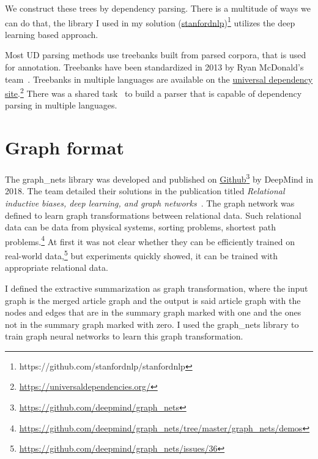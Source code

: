 We construct these trees by dependency parsing. There is a multitude of ways we can do that, the library I used in my solution (\href{https://github.com/stanfordnlp/stanfordnlp}{stanfordnlp})\footnote{https://github.com/stanfordnlp/stanfordnlp} utilizes the deep learning based approach.

Most UD parsing methods use treebanks built from parsed corpora, that is used for annotation. Treebanks have been standardized in 2013 by Ryan McDonald's team~\cite{TextRank}. Treebanks in multiple languages are available on the \href{https://universaldependencies.org/}{universal dependency site}.\footnote{\url{https://universaldependencies.org/}} There was a shared task~\cite{ParserSharedTask} to build a parser that is capable of dependency parsing in multiple languages.

\section{Graph format}

The graph\_nets library was developed and published on \href{https://github.com/deepmind/graph_nets}{Github}\footnote{\url{https://github.com/deepmind/graph_nets}} by DeepMind in 2018. The team detailed their solutions in the publication titled \textit{Relational inductive biases, deep learning, and graph networks}~\cite{GraphNet}. The graph network was defined to learn graph transformations between relational data. Such relational data can be data from physical systems, sorting problems, shortest path problems.\footnote{\url{https://github.com/deepmind/graph_nets/tree/master/graph_nets/demos}} At first it was not clear whether they can be efficiently trained on real-world data,\footnote{\url{https://github.com/deepmind/graph\_nets/issues/36}} but experiments quickly showed, it can be trained with appropriate relational data.

I defined the extractive summarization as graph transformation, where the input graph is the merged article graph and the output is said article graph with the nodes and edges that are in the summary graph marked with one and the ones not in the summary graph marked with zero. I used the graph\_nets library to train graph neural networks to learn this graph transformation.
	

